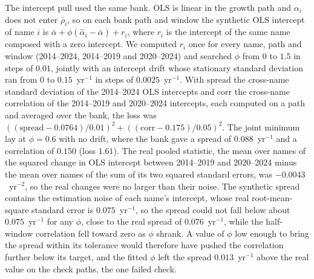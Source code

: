The intercept pull used the same bank. OLS is linear in the growth path and $\alpha_i$ does not enter $\bar\rho_i$,
so on each bank path and window the synthetic OLS intercept of name $i$ is $\bar\alpha + \phi(\hat\alpha_i -
\bar\alpha) + r_i$, where $r_i$ is the intercept of the same name composed with a zero intercept. We computed $r_i$
once for every name, path and window (2014--2024, 2014--2019 and 2020--2024) and searched $\phi$ from $0$ to $1.5$
in steps of $0.01$, jointly with an intercept drift whose stationary standard deviation ran from $0$ to
$0.15$~yr$^{-1}$ in steps of $0.0025$~yr$^{-1}$. With $\mathrm{spread}$ the cross-name standard deviation of the
2014--2024 OLS intercepts and $\mathrm{corr}$ the cross-name correlation of the 2014--2019 and 2020--2024 intercepts,
each computed on a path and averaged over the bank, the loss was $((\mathrm{spread} - 0.0764)/0.01)^2 +
((\mathrm{corr} - 0.175)/0.05)^2$.
The joint minimum lay at $\phi = 0.6$ with no drift, where the bank gave a spread of $0.088$~yr$^{-1}$ and a
correlation of $0.150$ (loss $1.61$). The real pooled statistic, the mean over names of the squared change in OLS
intercept between 2014--2019 and 2020--2024 minus the mean over names of the sum of its two squared standard
errors, was
$-0.0043$~yr$^{-2}$, so the real changes were no larger than their noise. The synthetic spread contains the
estimation noise of each name's intercept, whose real root-mean-square standard error is $0.075$~yr$^{-1}$, so the
spread could not fall below about $0.075$~yr$^{-1}$ for any $\phi$, close to the real spread of $0.076$~yr$^{-1}$,
while the half-window correlation fell toward zero as $\phi$ shrank. A value of $\phi$ low enough to bring the spread
within its tolerance would therefore have pushed the correlation further below its target, and the fitted $\phi$
left the spread $0.013$~yr$^{-1}$ above the
real value on the check paths, the one failed check.

